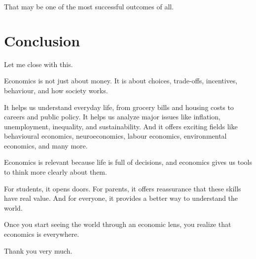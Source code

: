\documentclass[12pt]{article}
\begin{document}
That may be one of the most successful outcomes of all.

\section*{Conclusion}

Let me close with this.

Economics is not just about money. It is about choices, trade-offs, incentives, behaviour, and how society works.

It helps us understand everyday life, from grocery bills and housing costs to careers and public policy. It helps us analyze major issues like inflation, unemployment, inequality, and sustainability. And it offers exciting fields like behavioural economics, neuroeconomics, labour economics, environmental economics, and many more.

Economics is relevant because life is full of decisions, and economics gives us tools to think more clearly about them.

For students, it opens doors. For parents, it offers reassurance that these skills have real value. And for everyone, it provides a better way to understand the world.

Once you start seeing the world through an economic lens, you realize that economics is everywhere.

Thank you very much.
\end{document}
